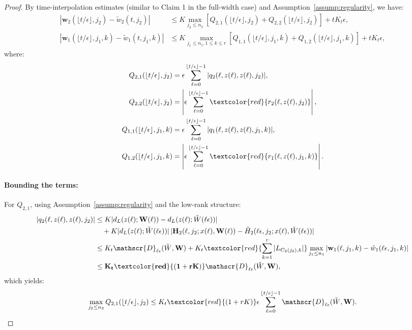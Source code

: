 \begin{proof}
By time-interpolation estimates (similar to Claim 1 in the full-width case) and Assumption~\ref{assump:regularity}, we have:
\begin{align*}
|\mathbf{w}_2(\lfloor t/\epsilon\rfloor, j_2) - \tilde{w}_2(t, j_2)| &\le K\max_{j_2 \le n_2}\left[Q_{2,1}(\lfloor t/\epsilon\rfloor, j_2) + Q_{2,2}(\lfloor t/\epsilon\rfloor, j_2)\right] + tK_t\epsilon,\\
|\mathbf{w}_1(\lfloor t/\epsilon\rfloor, j_1, k) - \tilde{w}_1(t, j_1, k)| &\le K\max_{j_1 \le n_1, 1 \le k \le r}\left[Q_{1,1}(\lfloor t/\epsilon\rfloor, j_1, k) + Q_{1,2}(\lfloor t/\epsilon\rfloor, j_1, k)\right] + tK_t\epsilon,
\end{align*}
where:
\begin{align*}
Q_{2,1}(\lfloor t/\epsilon\rfloor, j_2) &= \epsilon\sum_{\ell=0}^{\lfloor t/\epsilon\rfloor - 1}|q_2(\ell, z(\ell), z(\ell), j_2)|,\\
Q_{2,2}(\lfloor t/\epsilon\rfloor, j_2) &= \left|\epsilon\sum_{\ell=0}^{\lfloor t/\epsilon\rfloor - 1}\textcolor{red}{r_2(\ell, z(\ell), j_2)}\right|,\\
Q_{1,1}(\lfloor t/\epsilon\rfloor, j_1, k) &= \epsilon\sum_{\ell=0}^{\lfloor t/\epsilon\rfloor - 1}|q_1(\ell, z(\ell), z(\ell), j_1, k)|,\\
Q_{1,2}(\lfloor t/\epsilon\rfloor, j_1, k) &= \left|\epsilon\sum_{\ell=0}^{\lfloor t/\epsilon\rfloor - 1}\textcolor{red}{r_1(\ell, z(\ell), j_1, k)}\right|.
\end{align*}

\paragraph*{Bounding the terms:}

For $Q_{2,1}$, using Assumption~\ref{assump:regularity} and the low-rank structure:
\begin{align*}
|q_2(\ell, z(\ell), z(\ell), j_2)| &\le K|d_L(z(\ell); \mathbf{W}(\ell)) - d_L(z(\ell); \tilde{W}(\ell\epsilon))|\\
&\quad + K|d_L(z(\ell); \tilde{W}(\ell\epsilon))|\,|\mathbf{H}_2(\ell, j_2; x(\ell), \mathbf{W}(\ell)) - \tilde{H}_2(\ell\epsilon, j_2; x(\ell), \tilde{W}(\ell\epsilon))|\\
&\le K_t\mathscr{D}_{\ell\epsilon}(\tilde{W}, \mathbf{W}) + K_t\textcolor{red}{\sum_{k=1}^r |L_{C_2(j_2),k}|}\max_{j_1 \le n_1}|\mathbf{w}_1(\ell, j_1, k) - \tilde{w}_1(\ell\epsilon, j_1, k)|\\
&\le \mathbf{K_t\textcolor{red}{(1+rK)}}\mathscr{D}_{\ell\epsilon}(\tilde{W}, \mathbf{W}),
\end{align*}
which yields:
\[
\max_{j_2 \le n_2}Q_{2,1}(\lfloor t/\epsilon\rfloor, j_2) \le K_t\textcolor{red}{(1+rK)}\epsilon\sum_{\ell=0}^{\lfloor t/\epsilon\rfloor - 1}\mathscr{D}_{\ell\epsilon}(\tilde{W}, \mathbf{W}).
\]


\end{proof}
